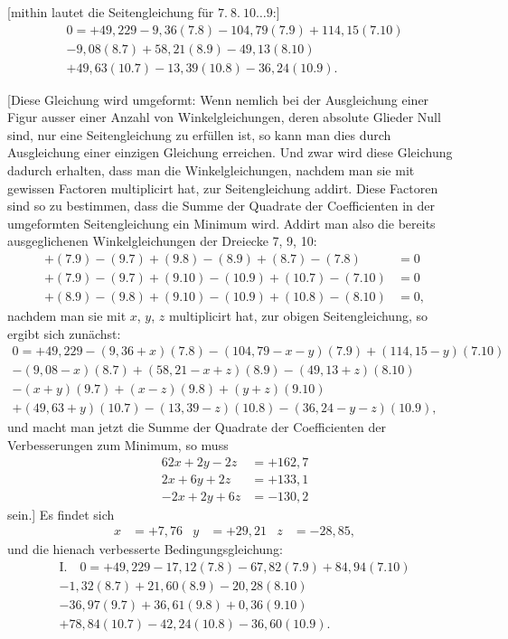 \documentclass[12pt,a4paper]{article}
\theoremstyle{plain}
\theoremstyle{definition}
\theoremstyle{remark}
\begin{document}
[mithin lautet die Seitengleichung f\"ur $7.\ 8.\ 10 \ldots 9$:]
\begin{multline*}
0 = +49{,}229 - 9{,}36(7.8) - 104{,}79(7.9) + 114{,}15(7.10)\\
- 9{,}08(8.7) + 58{,}21(8.9) - 49{,}13(8.10)\\
+ 49{,}63(10.7) - 13{,}39(10.8) - 36{,}24(10.9).
\end{multline*}

[Diese Gleichung wird umgeformt: Wenn nemlich bei der Ausgleichung einer Figur ausser einer Anzahl von Winkelgleichungen, deren absolute Glieder Null sind, nur eine Seitengleichung zu erf\"ullen ist, so kann man dies durch Ausgleichung einer einzigen Gleichung erreichen. Und zwar wird diese Gleichung dadurch erhalten, dass man die Winkelgleichungen, nachdem man sie mit gewissen Factoren multiplicirt hat, zur Seitengleichung addirt. Diese Factoren sind so zu bestimmen, dass die Summe der Quadrate der Coefficienten in der umgeformten Seitengleichung ein Minimum wird. Addirt man also die bereits ausgeglichenen Winkelgleichungen der Dreiecke 7, 9, 10:
\begin{align*}
+(7.9) - (9.7) + (9.8) - (8.9) + (8.7) - (7.8) &= 0\\
+(7.9) - (9.7) + (9.10) - (10.9) + (10.7) - (7.10) &= 0\\
+(8.9) - (9.8) + (9.10) - (10.9) + (10.8) - (8.10) &= 0,
\end{align*}
nachdem man sie mit $x$, $y$, $z$ multiplicirt hat, zur obigen Seitengleichung, so ergibt sich zun\"achst:
\begin{multline*}
0 = +49{,}229 - (9{,}36 + x)(7.8) - (104{,}79 - x - y)(7.9) + (114{,}15 - y)(7.10)\\
- (9{,}08 - x)(8.7) + (58{,}21 - x + z)(8.9) - (49{,}13 + z)(8.10)\\
-(x + y)(9.7) + (x - z)(9.8) + (y + z)(9.10)\\
+ (49{,}63 + y)(10.7) - (13{,}39 - z)(10.8) - (36{,}24 - y - z)(10.9),
\end{multline*}
und macht man jetzt die Summe der Quadrate der Coefficienten der Verbesserungen zum Minimum, so muss
\begin{align*}
62x + 2y - 2z &= +162{,}7\\
2x + 6y + 2z &= +133{,}1\\
-2x + 2y + 6z &= -130{,}2
\end{align*}
sein.] Es findet sich
\begin{align*}
x &= +7{,}76 & y &= +29{,}21 & z &= -28{,}85,
\end{align*}
und die hienach verbesserte Bedingungsgleichung:
\begin{multline*}
\text{I.}\quad 0 = +49{,}229 - 17{,}12(7.8) - 67{,}82(7.9) + 84{,}94(7.10)\\
- 1{,}32(8.7) + 21{,}60(8.9) - 20{,}28(8.10)\\
- 36{,}97(9.7) + 36{,}61(9.8) + 0{,}36(9.10)\\
+ 78{,}84(10.7) - 42{,}24(10.8) - 36{,}60(10.9).
\end{multline*}
\end{document}
